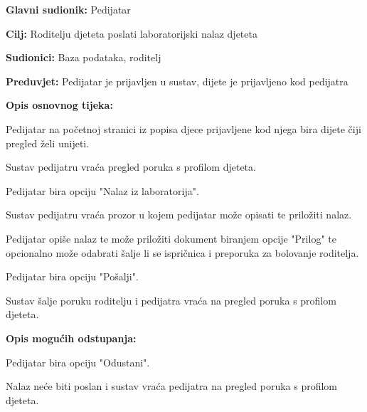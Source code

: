 					\noindent {}
					\begin{packed_item}
						
						\item \textbf{Glavni sudionik: }Pedijatar
						\item  \textbf{Cilj:} Roditelju djeteta poslati laboratorijski nalaz djeteta
						\item  \textbf{Sudionici:} Baza podataka, roditelj
						\item  \textbf{Preduvjet:} Pedijatar je prijavljen u sustav, dijete je prijavljeno kod pedijatra
						\item  \textbf{Opis osnovnog tijeka:}
						
						\item[] \begin{packed_enum}
							
							\item Pedijatar na početnoj stranici iz popisa djece prijavljene kod njega bira dijete čiji pregled želi unijeti.
							\item Sustav pedijatru vraća pregled poruka s profilom djeteta.
							\item Pedijatar bira opciju "Nalaz iz laboratorija".
							\item Sustav pedijatru vraća prozor u kojem pedijatar može opisati te priložiti nalaz.
							\item Pedijatar opiše nalaz te može priložiti dokument biranjem opcije "Prilog" te opcionalno može odabrati šalje li se ispričnica i preporuka za bolovanje roditelja.
							\item Pedijatar bira opciju "Pošalji".
							\item Sustav šalje poruku roditelju i pedijatra vraća na pregled poruka s profilom djeteta.
						\end{packed_enum}
						
						\item  \textbf{Opis mogućih odstupanja:}
						
						\item[] \begin{packed_item}
							
							\item[6.a] Pedijatar bira opciju "Odustani".
							\item[] \begin{packed_enum}
								
								\item Nalaz neće biti poslan i sustav vraća pedijatra na pregled poruka s profilom djeteta.
							\end{packed_enum}
							
							
						\end{packed_item}
						
						
					\end{packed_item}
					
